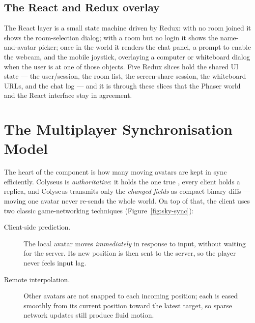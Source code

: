 \subsection{The React and Redux overlay}

The React layer is a small state machine driven by Redux: with no room joined it
shows the room-selection dialog; with a room but no login it shows the
name-and-avatar picker; once in the world it renders the chat panel, a prompt to
enable the webcam, and the mobile joystick, overlaying a computer or whiteboard
dialog when the user is at one of those objects. Five Redux slices hold the shared
UI state --- the user/session, the room list, the screen-share session, the
whiteboard URLs, and the chat log --- and it is through these slices that the
Phaser world and the React interface stay in agreement.

\section{The Multiplayer Synchronisation Model}
\label{sec:sky-sync}

The heart of the component is how many moving avatars are kept in sync
efficiently. Colyseus is \emph{authoritative}: it holds the one true
, every client holds a replica, and Colyseus transmits only the
\emph{changed fields} as compact binary diffs --- moving one avatar never
re-sends the whole world. On top of that, the client uses two classic
game-networking techniques (Figure~\ref{fig:sky-sync}):

\begin{description}
  \item[Client-side prediction.] The local avatar moves \emph{immediately} in
  response to input, without waiting for the server. Its new position is then sent
  to the server, so the player never feels input lag.
  \item[Remote interpolation.] Other avatars are not snapped to each incoming
  position; each is eased smoothly from its current position toward the latest
  target, so sparse network updates still produce fluid motion.
\end{description}

